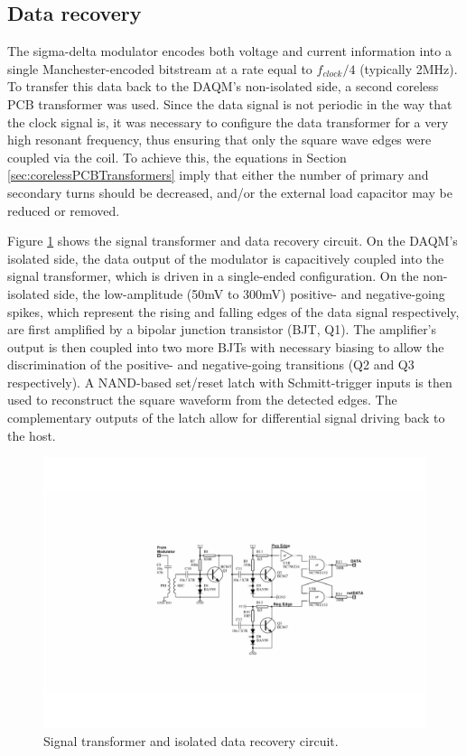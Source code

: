 \documentclass[conference]{IEEEtran}
\begin{document}
	\subsection{Data recovery}
	The sigma-delta modulator encodes both voltage and current information into a single Manchester-encoded bitstream at a rate equal to $ f_{clock}/4 $ (typically 2MHz).  To transfer this data back to the DAQM's non-isolated side, a second coreless PCB transformer was used.  Since the data signal is not periodic in the way that the clock signal is, it was necessary to configure the data transformer for a very high resonant frequency, thus ensuring that only the square wave edges were coupled via the coil.  To achieve this, the equations in Section \ref{sec:corelessPCBTransformers} imply that either the number of primary and secondary turns should be decreased, and/or the external load capacitor may be reduced or removed.
	
	Figure \ref{fig:TFdat} shows the signal transformer and data recovery circuit.  On the DAQM's isolated side, the data output of the modulator is capacitively coupled into the signal transformer, which is driven in a single-ended configuration.  On the non-isolated side, the low-amplitude (50mV to 300mV) positive- and negative-going spikes, which represent the rising and falling edges of the data signal respectively, are first amplified by a bipolar junction transistor (BJT, Q1). The amplifier's output is then coupled into two more BJTs with necessary biasing to allow the discrimination of the positive- and negative-going transitions (Q2 and Q3 respectively). A NAND-based set/reset latch with Schmitt-trigger inputs is then used to reconstruct the square waveform from the detected edges.  The complementary outputs of the latch allow for differential signal driving back to the host.  
%
	\begin{figure}[t]
		\centering
		\includegraphics[width=1\columnwidth]{./img/TFdat_BW}
		\caption{Signal transformer and isolated data recovery circuit.}
		\label{fig:TFdat}
	\end{figure}
%	
\end{document}
